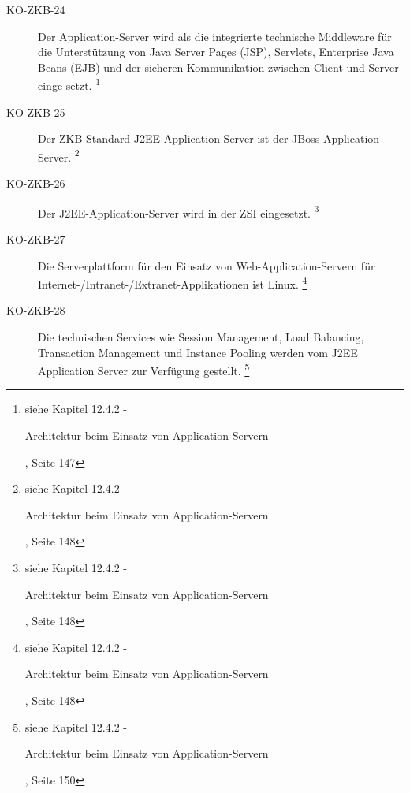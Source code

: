 \documentclass[abstracton, listof=totocnumbered,
bibliography=totocnumbered]{scrreprt}
\begin{document}
\begin{description}
    \item[KO-ZKB-24] Der Application-Server wird als die integrierte technische
    Middleware für die Unterstützung von Java Server Pages (JSP), Servlets,
    Enterprise Java Beans (EJB) und der sicheren Kommunikation zwischen Client
    und Server einge-setzt.
    \footnote{siehe Kapitel 12.4.2 -
    \begin{itshape}Architektur beim Einsatz von
    Application-Servern\end{itshape}, Seite 147}
    
    \item[KO-ZKB-25] Der ZKB Standard-J2EE-Application-Server ist der JBoss
    Application Server.
    \footnote{siehe Kapitel 12.4.2 -
    \begin{itshape}Architektur beim Einsatz von
    Application-Servern\end{itshape}, Seite 148}
    
    \item[KO-ZKB-26] Der J2EE-Application-Server wird in der ZSI eingesetzt.
    \footnote{siehe Kapitel 12.4.2 -
    \begin{itshape}Architektur beim Einsatz von
    Application-Servern\end{itshape}, Seite 148}
    
    \item[KO-ZKB-27] Die Serverplattform für den Einsatz von
    Web-Application-Servern für Internet-/Intranet-/Extranet-Applikationen ist Linux.
    \footnote{siehe Kapitel 12.4.2 -
    \begin{itshape}Architektur beim Einsatz von
    Application-Servern\end{itshape}, Seite 148}
    
    \item[KO-ZKB-28] Die technischen Services wie Session Management, Load
    Balancing, Transaction Management und Instance Pooling werden vom J2EE Application
    Server zur Verfügung gestellt.
    \footnote{siehe Kapitel 12.4.2 -
    \begin{itshape}Architektur beim Einsatz von
    Application-Servern\end{itshape}, Seite 150}
    

\end{description}
\end{document}
